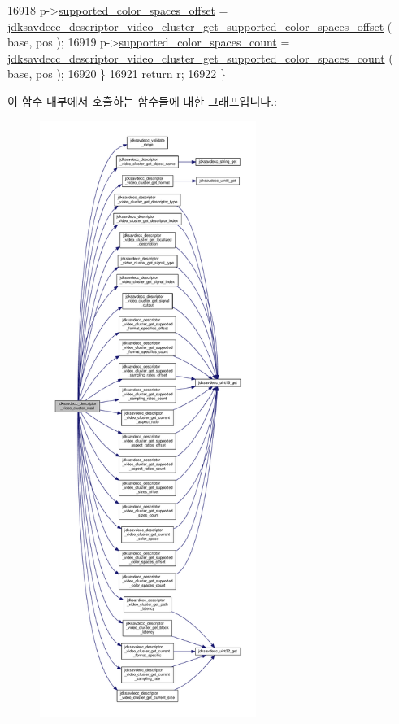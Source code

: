 \begin{DoxyCode}
16918         p->\hyperlink{structjdksavdecc__descriptor__video__unit__cluster_a765d0a4a3da2b125e5523cbec6a61251}{supported\_color\_spaces\_offset} = 
      \hyperlink{group__descriptor__video__cluster_ga9cf87e0a57bd0f524963256c8d0bfabe}{jdksavdecc\_descriptor\_video\_cluster\_get\_supported\_color\_spaces\_offset}
      ( base, pos );
16919         p->\hyperlink{structjdksavdecc__descriptor__video__unit__cluster_a020f3551cc29786237d98e5e70afce8a}{supported\_color\_spaces\_count} = 
      \hyperlink{group__descriptor__video__cluster_ga56622182f1cd81e0cd76302c38650703}{jdksavdecc\_descriptor\_video\_cluster\_get\_supported\_color\_spaces\_count}
      ( base, pos );
16920     \}
16921     \textcolor{keywordflow}{return} r;
16922 \}
\end{DoxyCode}


이 함수 내부에서 호출하는 함수들에 대한 그래프입니다.\+:
\nopagebreak
\begin{figure}[H]
\begin{center}
\leavevmode
\includegraphics[height=550pt]{group__descriptor__video__cluster_ga7bbe7070842f45ad622fb2cf7404ed65_cgraph}
\end{center}
\end{figure}


